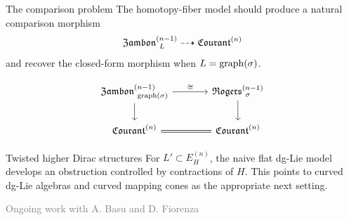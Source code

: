 \documentclass[beamer,10pt]{standalone}
\begin{document}
\begin{frame}{The comparison problem}
  The homotopy-fiber model should produce a natural comparison morphism
  \[
    \Zambon[L]{n-1}
      \dashrightarrow
    \Courant{n}
  \]
  and recover the closed-form morphism when $L=\graph(\sigma)$.

  \vfill\pause
  \begin{displaymath}
    \begin{tikzcd}[ampersand replacement=\&,column sep=large]
      \Zambon[\graph(\sigma)]{n-1}
        \ar[r,"\cong"] \ar[d]
        \& \Rogers[\sigma]{n-1} \ar[d] \\
      \Courant{n}
        \ar[r,equal]
        \& \Courant{n}
    \end{tikzcd}
  \end{displaymath}

  \vfill\pause
  \begin{alertblock}{Twisted higher Dirac structures}
    For $L'\subset E_H^{(n)}$, the naive flat dg-Lie model develops an
    obstruction controlled by contractions of $H$. This points to curved
    dg-Lie algebras and curved mapping cones as the appropriate next setting.
  \end{alertblock}

  \vfill
  \hfill\textcolor{gray}{Ongoing work with A. Basu and D. Fiorenza}
\end{frame}
\end{document}
